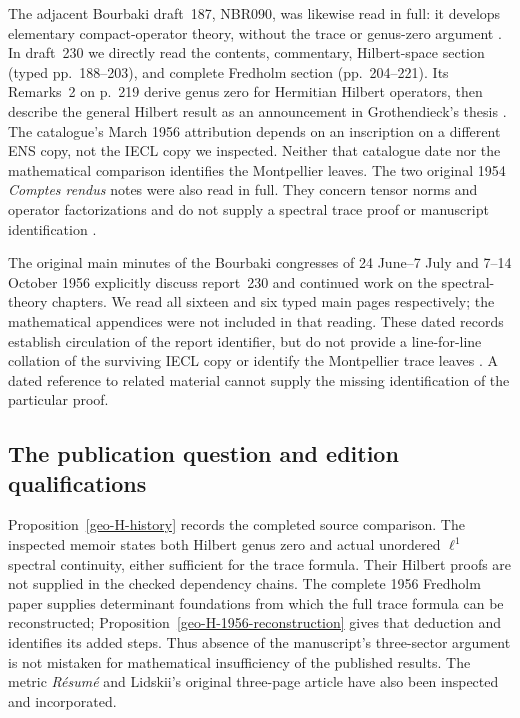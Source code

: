 The adjacent Bourbaki draft~187, NBR090, was likewise read in full: it
develops elementary compact-operator theory, without the trace or
genus-zero argument \cite{catBourbaki187}. In draft~230 we directly read
the contents, commentary, Hilbert-space section (typed pp.~188--203), and
complete Fredholm section (pp.~204--221). Its Remarks~2 on p.~219 derive
genus zero for Hermitian Hilbert operators, then describe the general
Hilbert result as an announcement in Grothendieck's thesis
\cite[Chapter~III, \S4, p.~219]{catBourbaki230}.
The catalogue's March 1956 attribution depends on an inscription on a
different ENS copy, not the IECL copy we inspected. Neither that catalogue
date nor the mathematical comparison identifies the Montpellier leaves.
The two original 1954 \emph{Comptes rendus} notes were also read in full.
They concern tensor norms and operator factorizations and do not supply
a spectral trace proof or manuscript identification
\cite{rootGrothendieckCR1954I,rootGrothendieckCR1954II}.

The original main minutes of the Bourbaki congresses of 24 June--7 July
and 7--14 October 1956 explicitly discuss report~230 and continued work
on the spectral-theory chapters. We read all sixteen and six typed main
pages respectively; the mathematical appendices were not included in
that reading. These dated records establish circulation of the report
identifier, but do not provide a line-for-line collation of the surviving
IECL copy or identify the Montpellier trace leaves
\cite{geoBourbakiTribu39,geoBourbakiTribu40}. A dated reference to related
material cannot supply the missing identification of the particular proof.

\subsection{The publication question and edition qualifications}

Proposition~\ref{geo-H-history} records the completed source comparison.
The inspected memoir states both Hilbert genus zero and actual
unordered $\ell^1$ spectral continuity, either sufficient for the
trace formula. Their Hilbert proofs are not supplied in the checked
dependency chains. The complete 1956 Fredholm paper supplies
determinant foundations from which the full trace formula can be
reconstructed; Proposition~\ref{geo-H-1956-reconstruction} gives that
deduction and identifies its added steps. Thus absence of the
manuscript's three-sector argument is not mistaken for mathematical
insufficiency of the published results. The metric \emph{R\'esum\'e}
and Lidskii's original three-page article have also been inspected
and incorporated.

